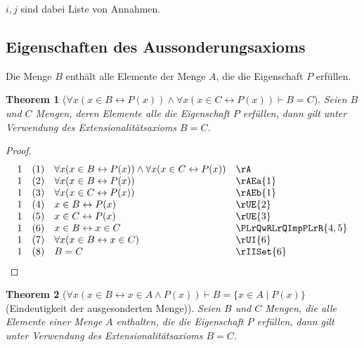 \documentclass{book}
\theoremstyle{plain}
\newtheorem{theorem}{Theorem}
\theoremstyle{remark}
\theoremstyle{definition}
\begin{document}
\(i,j\) sind dabei Liste von Annahmen.

\subsection{Eigenschaften des Aussonderungsaxioms}

Die Menge \( B \) enthält alle Elemente der Menge \( A \), die die Eigenschaft \( P \) erfüllen.

\label{FaxLpxInBLrPLpxRpRpAndFaxLpxInCLrPLpxRpRpImpBEqualsC}
\begin{theorem}[\(\forall x (x \in B \leftrightarrow P(x)) \land \forall x (x \in C \leftrightarrow P(x)) \vdash B = C\)]
	Seien \( B \) und \( C \) Mengen, deren Elemente alle  die Eigenschaft \( P \) erfüllen, dann gilt unter Verwendung des Extensionalitätsaxioms \(B = C\).
\end{theorem}
\begin{proof}
	\[
	\begin{array}{llll}
		1 & (1) & \forall x (x \in B \leftrightarrow P(x)) \land \forall x (x \in C \leftrightarrow P(x)) & \rA \\
		1 & (2) & \forall x (x \in B \leftrightarrow P(x)) & \rAEa{1} \\
		1 & (3) & \forall x (x \in C \leftrightarrow P(x)) & \rAEb{1} \\
		1 & (4) & x \in B \leftrightarrow P(x) & \rUE{2} \\
		1 & (5) & x \in C \leftrightarrow P(x) & \rUE{3} \\
		1 & (6) & x \in B \leftrightarrow x \in C & \PLrQwRLrQImpPLrR{4,5} \\
		1 & (7) & \forall x (x \in B \leftrightarrow x \in C) & \rUI{6} \\
		1 & (8) & B=C & \rIISet{6} \\
	\end{array}
	\]
\end{proof}

\label{FaxLpxInBLrxInAAndPLpxRpRpImpBEqualsLbxInAMidPLpxRpRb}
\begin{theorem}[\(\forall x(x\in B\leftrightarrow x\in A\land P(x))\vdash B=\{x\in A \mid P(x)\}\) (Eindeutigkeit der ausgesonderten Menge)]
	Seien \( B \) und \( C \) Mengen, die alle Elemente einer Menge \( A \) enthalten, die die Eigenschaft \( P \) erfüllen, dann gilt unter Verwendung des Extensionalitätsaxioms \(B = C\).
\end{theorem}
\end{document}
